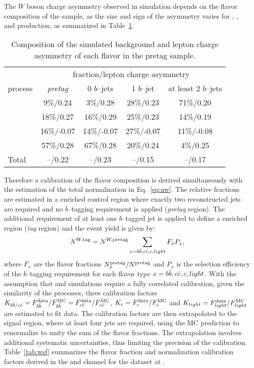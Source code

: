 The $W$ boson charge asymmetry observed in simulation depends
on the flavor composition of the sample, as the size and sign of the
asymmetry varies for \wbb{}, \wcc{}, \wc{} and \wlight{} production,
as summarized in Table~\ref{tab:wca}.
\begin{table}
  \centering
  \begin{tabular}{lcccc}
    \toprule
     & \multicolumn{4}{c}{fraction/lepton charge asymmetry} \\
    process & {\it pretag} & 0 $b$--jets & 1 $b$--jet & at least 2 $b$--jets \\
    \midrule
    \wbb{} & 9\%/0.24 & 3\%/0.28 & 28\%/0.23 & 71\%/0.20 \\
    \wcc{} & 18\%/0.27 & 16\%/0.29 & 25\%/0.23 & 14\%/0.19 \\
    \wc{} & 16\%/-0.07 & 14\%/-0.07 & 27\%/-0.07 & 11\%/-0.08 \\
    \wlight{} & 57\%/0.28 & 67\%/0.28 & 20\%/0.24 & 4\%/0.25 \\ 
    \midrule
    Total \wjets{} & --/0.22 & --/0.23 & --/0.15 & --/0.17 \\
   \bottomrule
  \end{tabular}
  \caption{Composition of the simulated \wjets{} background and lepton charge
    asymmetry of each flavor in the \ljets{} pretag sample.}
  \label{tab:wca}
\end{table}
Therefore a calibration of the flavor composition is derived
simultaneously with the estimation of the total normalization in
Eq.~\ref{eq:nw}.
The relative fractions are estimated in a \wjets{} enriched control
region where exactly two reconstructed jets are required and no
$b$--tagging requirement is applied ({\it pretag} region). 
The additional requirement of at least one $b$--tagged jet is applied
to define a \wbb{} enriched region ({\it tag} region) and the \wjets{}
event yield is given by: 
\begin{equation}
\label{eq:nwt}
N^{W,{\rm tag}} = 
N^{W,{\rm pretag}}
\sum_{x=b\bar{b}{}, c\bar{c}{}, c, light} F_xP_x,
\end{equation}
where $F_x$ are the flavor fractions $N^{\rm pretag}_x/N^{\rm pretag}$
and $P_x$ is the selection efficiency of the $b$--tagging requirement for each
flavor type $x = b\bar{b}{}, c\bar{c}{}, c, light$. 
 With the assumption that \wbb{} and \wcc{} simulations require a
 fully correlated calibration, given the similarity of the processes,
 three calibration factors $K_{b\bar{b}{}/c\bar{c}{}}=F^{\rm
   data}_{b\bar{b}{}}/F^{\rm MC}_{b\bar{b}{}}=F^{\rm
   data}_{c\bar{c}{}}/F^{\rm MC}_{c\bar{c}{}}$, $K_c=F^{\rm
   data}_{c}/F^{\rm MC}_{c}$ and $K_{light}=F^{\rm
   data}_{light}/F^{\rm MC}_{light}$ are estimated to fit data. The
 calibration factors are then extrapolated to the signal region, where
 at least four jets are required, using the MC prediction
to renormalize to unity the sum of the flavor fractions.
The extrapolation involves additional systematic uncertainties, thus
limiting the precision of the calibration.
Table~\ref{tab:wsf} summarizes the flavor fraction and normalization
calibration factors derived in the \ejets{} and \mujets{} channel for
the dataset at \seventev{}.


